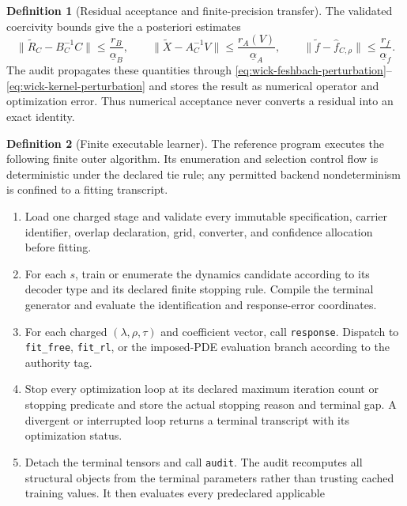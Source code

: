 \documentclass[11pt]{article}
\numberwithin{section}{part}
\theoremstyle{plain}
\theoremstyle{definition}
\newtheorem{definition}[definition]{Definition}
\theoremstyle{remark}
\begin{document}
\begin{definition}[Residual acceptance and finite-precision transfer]
The validated coercivity bounds give the a posteriori estimates
\begin{equation}
 \|\widetilde R_C-B_C^{-1}C\|
 \le\frac{r_B}{\underline\alpha_B},
 \qquad
 \|\widetilde X-A_C^{-1}V\|
 \le\frac{r_A(V)}{\underline\alpha_A},
 \qquad
 \|\widetilde f-\widehat f_{C,\rho}\|
 \le\frac{r_f}{\underline\alpha_f}.
 \label{eq:wick-code-forward-error}
\end{equation}
The audit propagates these quantities through
\eqref{eq:wick-feshbach-perturbation}--
\eqref{eq:wick-kernel-perturbation} and stores the result as numerical operator
and optimization error.  Thus numerical acceptance never converts a residual
into an exact identity.
\end{definition}

\begin{definition}[Finite executable learner]
\label{def:wick-finite-executable-learner}
The reference program executes the following finite outer algorithm.  Its
enumeration and selection control flow is deterministic under the declared tie
rule; any permitted backend nondeterminism is confined to a fitting transcript.
\begin{enumerate}[label=\textup{(E\arabic*)}]
\item Load one charged stage and validate every immutable specification,
      carrier identifier, overlap declaration, grid, converter, and confidence
      allocation before fitting.
\item For each \(s\), train or enumerate the dynamics candidate according to
      its decoder type and its declared finite stopping rule.  Compile the
      terminal generator and evaluate the identification and response-error
      coordinates.
\item For each charged \((\lambda,\rho,\tau)\) and coefficient vector, call
      \texttt{response}.  Dispatch to \texttt{fit\_free}, \texttt{fit\_rl}, or
      the imposed-PDE evaluation branch according to the authority tag.
\item Stop every optimization loop at its declared maximum iteration count or
      stopping predicate and store the actual stopping reason and terminal
      gap.  A divergent or interrupted loop returns a terminal transcript with
      its optimization status.
\item Detach the terminal tensors and call \texttt{audit}.  The audit recomputes
      all structural objects from the terminal parameters rather than trusting
      cached training values.  It then evaluates every predeclared applicable

\end{enumerate}
\end{definition}
\end{document}
